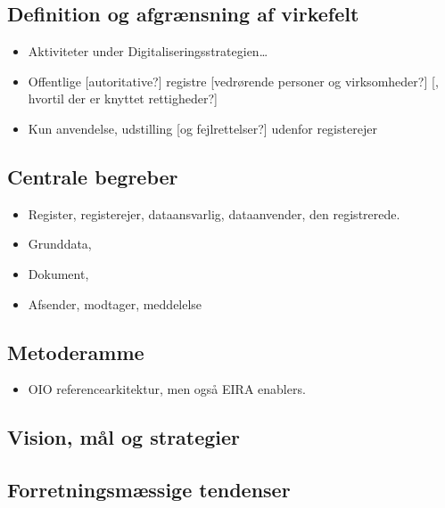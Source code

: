 \subsection{Definition og afgrænsning af
virkefelt}\label{definition-og-afgruxe6nsning-af-virkefelt}

\begin{itemize}
\tightlist
\item
  Aktiviteter under Digitaliseringsstrategien\ldots{}
\item
  Offentlige {[}autoritative?{]} registre {[}vedrørende personer og
  virksomheder?{]} {[}, hvortil der er knyttet rettigheder?{]}
\item
  Kun anvendelse, udstilling {[}og fejlrettelser?{]} udenfor
  registerejer
\end{itemize}

\subsection{Centrale begreber}\label{centrale-begreber}

\begin{itemize}
\tightlist
\item
  Register, registerejer, dataansvarlig, dataanvender, den registrerede.
\item
  Grunddata,
\item
  Dokument,
\item
  Afsender, modtager, meddelelse
\end{itemize}

\subsection{Metoderamme}\label{metoderamme}

\begin{itemize}
\tightlist
\item
  OIO referencearkitektur, men også EIRA enablers.
\end{itemize}

\subsection{Vision, mål og
strategier}\label{vision-muxe5l-og-strategier}

\subsection{Forretningsmæssige
tendenser}\label{forretningsmuxe6ssige-tendenser}

